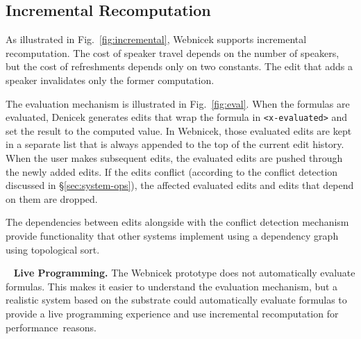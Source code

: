 \documentclass[sigconf,anonymous,screen]{acmart}
\newcommand{\note}[1]{\textcolor{red}{#1}}
\DeclareRobustCommand{\keyideabox}[3]{\begin{tcolorbox}[breakable,
  boxsep=5pt,left=0pt,right=0pt,top=0pt,bottom=0pt,width=\dimexpr\columnwidth\relax,
  colback=gray!20,colframe=gray!20,
  enlarge bottom by=0pt,enlarge top by=0pt,
  arc=0pt,outer arc=0pt]
\lettrine[lraise=0.3]{\LARGE #1}{~}
\small \textbf{#2.} #3
\end{tcolorbox}
}
\begin{document}

\subsection{Incremental Recomputation}
\label{sec:impl-incremental}

As illustrated in Fig.~\ref{fig:incremental}, Webnicek supports incremental recomputation.
The cost of speaker travel depends on the number of speakers, but the cost of refreshments
depends only on two constants. The edit that adds a speaker invalidates only the former computation.

The evaluation mechanism is illustrated in Fig.~\ref{fig:eval}. When the formulas are evaluated,
Denicek generates edits that wrap the formula in {\small\Verb_<x-evaluated>_} and set the result
to the computed value. In Webnicek, those evaluated edits are kept in a separate list that is always
appended to the top of the current edit history. When the user makes subsequent edits, the evaluated
edits are pushed through the newly added edits. If the edits conflict (according to the conflict
detection discussed in \S\ref{sec:system-ops}), the affected evaluated edits and edits that
depend on them are dropped.

The dependencies between edits alongside with the conflict detection mechanism provide functionality
that other systems implement using a dependency graph using topological sort.

\keyideabox{\faRefresh}{Live Programming}{The Webnicek prototype does not automatically
evaluate formulas. This makes it easier to understand the evaluation
mechanism, but a realistic system based on the substrate could automatically evaluate
formulas to provide a live programming experience \cite{petricek-2020-foundations,rein-2019-live}
and use incremental recomputation for performance~reasons.}


%
\end{document}
